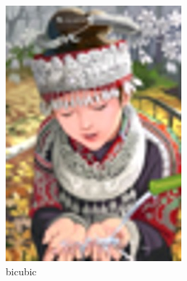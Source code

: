 \documentclass[a4paper]{book}
\begin{document}
\begin{figure}[t]
\begin{subfigure}{.24\linewidth}
        \includegraphics[width=\linewidth]{images/comic_SRF_4_bicubic.jpg}
        \caption{bicubic}
        \label{fig:srgan_bicubic}
    \end{subfigure}
    \begin{subfigure}{.24\linewidth}

\end{subfigure}
\end{figure}
\end{document}
